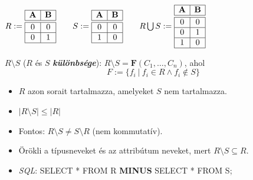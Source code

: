 \documentclass[tikz,12pt,margin=0px]{article}
\begin{document}
    \begin{center}
        $R := \begin{array}{|c|c|}
         \hline
            \text{\textbf{A}} & \text{\textbf{B}} \\ \hline \hline
            0 & 0 \\ \hline
            0 & 1 \\ \hline
        \end{array} \qquad S := \begin{array}{|c|c|}
         \hline
            \text{\textbf{A}} & \text{\textbf{B}} \\ \hline \hline
            0 & 0 \\ \hline
            1 & 0 \\ \hline
        \end{array} \qquad
        R \bigcup S := \begin{array}{|c|c|}
         \hline
            \text{\textbf{A}} & \text{\textbf{B}} \\ \hline \hline
            0 & 0 \\ \hline
            0 & 1 \\ \hline
            1 & 0 \\ \hline
        \end{array}$
    \end{center}

    \noindent $R \setminus S$ ($R$ és $S$ \emph{\textbf{különbsége}}):  $R \setminus S = \textbf{F}(C_1, \ldots, C_n)$, ahol
    \[
        F := \Big\{f_i\ \Big|\ f_i \in R \wedge f_i \not \in S\Big\}
    \]
    \begin{itemize}
        \item $R$ azon sorait tartalmazza, amelyeket $S$ nem tartalmazza.
        \item $\Big|R \setminus S\Big| \leq \Big|R\Big|$
        \item Fontos: $R \setminus S \neq S \setminus R$ (nem kommutatív).
        \item Örökli a típusneveket és az attribútum neveket, mert $R \setminus S \subseteq R$.
        \item \emph{SQL}: SELECT * FROM R \textbf{MINUS} SELECT * FROM S;
    \end{itemize}
\end{document}
